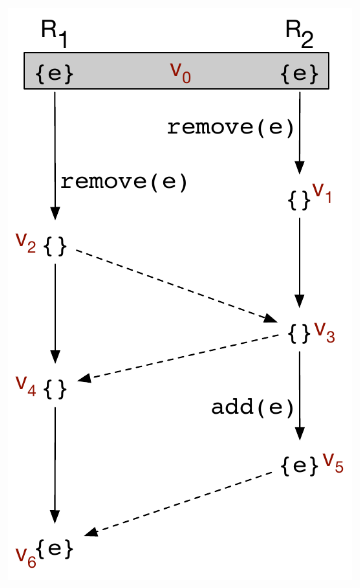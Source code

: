 \begin{figure}[ht]
  \centering
  \begin{subfigure}[t]{0.4\columnwidth}
    \includegraphics[scale=0.35]{Figures/mrdt-execs-3}
    \caption{}
    \label{fig:mrdt-exec-3}
  \end{subfigure}
  \begin{subfigure}[t]{0.57\columnwidth}

\end{subfigure}
\end{figure}

